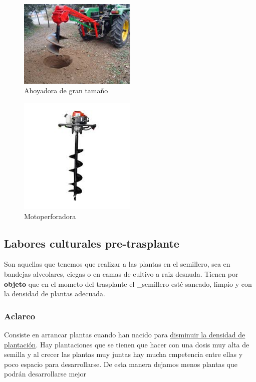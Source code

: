 \documentclass[a4paper,12pt,oneside]{article}
\begin{document}
\begin{enumerate}
\begin{center}
\begin{figure}[htbp]
\centering
\includegraphics[width=0.5\textwidth]{./img_uf1596/perf_tractor.jpg}
\caption{\label{fig:orgbea64be}
Ahoyadora de gran tamaño}
\end{figure}

\begin{figure}[htbp]
\centering
\includegraphics[width=0.5\textwidth]{./img_uf1596/motoperforadora.jpg}
\caption{\label{fig:org83e4842}
Motoperforadora}
\end{figure}
\end{center}
\end{enumerate}

\subsection{Labores culturales pre-trasplante}
\label{sec:org9e24769}

Son aquellas que tenemos que realizar a las plantas en el semillero, sea en
bandejas alveolares, ciegas o en camas de cultivo a raiz desnuda. Tienen por
\textbf{objeto} que en el mometo del trasplante el \_semillero esté saneado, limpio y
con la densidad de plantas adecuada.  

\subsubsection{Aclareo}
\label{sec:orgec51b8f}
Consiste en arrancar plantas cuando han nacido para \uline{disminuir la densidad de 
plantación}. Hay plantaciones que se tienen que hacer con una dosis muy alta de
semilla y al crecer las plantas muy juntas hay mucha cmpetencia entre ellas y
poco espacio para desarrollarse. De esta manera dejamos menos plantas que podrán
desarrollarse mejor
\end{document}
